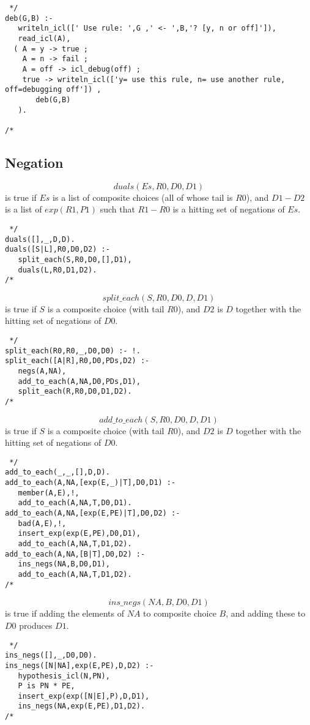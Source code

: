 \documentclass[11pt,fleqn]{article}
\begin{document}
\begin{verbatim} */
deb(G,B) :-
   writeln_icl([' Use rule: ',G ,' <- ',B,'? [y, n or off]']),
   read_icl(A),
  ( A = y -> true ;
    A = n -> fail ;
    A = off -> icl_debug(off) ;
    true -> writeln_icl(['y= use this rule, n= use another rule, off=debugging off']) ,
       deb(G,B)
   ).

/* \end{verbatim}
\subsection{Negation}
\[duals(Es,R0,D0,D1)\]
is true if $Es$ is a list of composite choices (all of whose tail is
$R0$), and $D1-D2$ is a list of $exp(R1,P1)$ such that $R1-R0$ is a
hitting set of negations of $Es$.
\begin{verbatim} */
duals([],_,D,D).
duals([S|L],R0,D0,D2) :-
   split_each(S,R0,D0,[],D1),
   duals(L,R0,D1,D2).
/* \end{verbatim}

\[split\_each(S,R0,D0,D,D1)\]
is true if $S$ is a composite choice (with tail $R0$), and
$D2$ is $D$ together with the hitting set of negations of $D0$.
\begin{verbatim} */
split_each(R0,R0,_,D0,D0) :- !.
split_each([A|R],R0,D0,PDs,D2) :-
   negs(A,NA),
   add_to_each(A,NA,D0,PDs,D1),
   split_each(R,R0,D0,D1,D2).
/* \end{verbatim}

\[add\_to\_each(S,R0,D0,D,D1)\]
is true if $S$ is a composite choice (with tail $R0$), and
$D2$ is $D$ together with the hitting set of negations of $D0$.
\begin{verbatim} */
add_to_each(_,_,[],D,D).
add_to_each(A,NA,[exp(E,_)|T],D0,D1) :-
   member(A,E),!,
   add_to_each(A,NA,T,D0,D1).
add_to_each(A,NA,[exp(E,PE)|T],D0,D2) :-
   bad(A,E),!,
   insert_exp(exp(E,PE),D0,D1),
   add_to_each(A,NA,T,D1,D2).
add_to_each(A,NA,[B|T],D0,D2) :-
   ins_negs(NA,B,D0,D1),
   add_to_each(A,NA,T,D1,D2).
/* \end{verbatim}

\[ins\_negs(NA,B,D0,D1)\]
is true if adding the elements of $NA$ to composite choice $B$, and
adding these to $D0$ produces $D1$.
\begin{verbatim} */
ins_negs([],_,D0,D0).
ins_negs([N|NA],exp(E,PE),D,D2) :-
   hypothesis_icl(N,PN),
   P is PN * PE,
   insert_exp(exp([N|E],P),D,D1),
   ins_negs(NA,exp(E,PE),D1,D2).
/* \end{verbatim}
\end{document}
